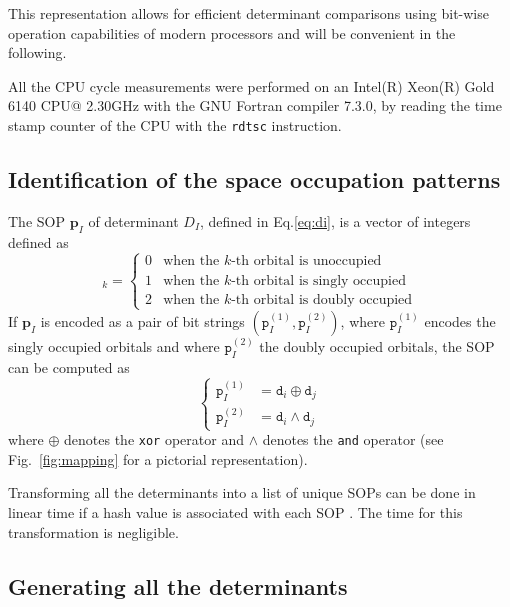 \documentclass[aip,jcp,reprint,showkeys]{revtex4-1}
\newcommand{\md}{\mathtt{d}}
\newcommand{\mpp}{\mathtt{p}}
\newcommand{\mpv}{\mathbf{p}}
\newcommand{\sop}{SOP}
\newcommand{\cpu}{CPU}
\begin{document}
This representation allows for efficient determinant comparisons using bit-wise operation 
capabilities of modern processors\cite{Scemama_2013} and will be convenient in the following.

All the \cpu{} cycle measurements were performed on an Intel(R) Xeon(R)
Gold 6140 \cpu @ 2.30GHz with the GNU Fortran compiler 7.3.0, by reading
the time stamp counter of the \cpu{} with the \texttt{rdtsc} instruction.


\subsection{Identification of the space occupation patterns}

The {\sop} $\mpv_I$ of determinant $D_I$, 
defined in Eq.\eqref{eq:di},
is a vector of integers defined as
\begin{equation}
  [\mpv_I]_k = 
  \begin{cases} 
    0 & \text{when the $k$-th orbital is unoccupied} \\
    1 & \text{when the $k$-th orbital is singly occupied} \\
    2 & \text{when the $k$-th orbital is doubly occupied}
  \end{cases} 
\end{equation}
If $\mpv_I$ is encoded as a pair of bit strings $(\mpp_I^{(1)}, \mpp_I^{(2)})$, where
$\mpp_I^{(1)}$ encodes the singly occupied orbitals and where $\mpp_I^{(2)}$ the doubly
occupied orbitals, the {\sop} can be computed as
\begin{equation}
\label{eq:sop}
\begin{cases}
  \mpp_I^{(1)} & = \md_i \oplus \md_j \\
  \mpp_I^{(2)} & = \md_i \wedge \md_j 
  \end{cases} 
\end{equation}
where $\oplus$ denotes the \texttt{xor} operator and $\wedge$ denotes the
\texttt{and} operator (see Fig.~\ref{fig:mapping} for a pictorial representation).

Transforming all the determinants into a list of unique \sop s can be done
in linear time if a hash value is associated with each \sop
.\cite{Bitton_1983} The time for this transformation is negligible.


\subsection{Generating all the determinants}
\end{document}
